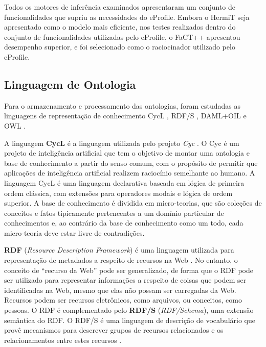 Todos os motores de inferência examinados apresentaram um conjunto de funcionalidades que supriu as necessidades do eProfile. Embora o HermiT seja apresentado como o modelo mais eficiente, nos testes realizados dentro do conjunto de funcionalidades utilizadas pelo eProfile, o FaCT++ apresentou desempenho superior, e foi selecionado como o raciocinador utilizado pelo eProfile.


\subsection{Linguagem de Ontologia}
\label{sec:ling_ontologia}

Para o armazenamento e processamento das ontologias, foram estudadas as linguagens de representação de conhecimento CycL \cite{lenat89}, RDF/S \cite{rdfs}, DAML+OIL \cite{daconta03} e OWL \cite{daconta03}.

A linguagem \textbf{CycL} é a linguagem utilizada pelo projeto \emph{Cyc} \cite{lenat89}. O Cyc é um projeto de inteligência artificial que tem o objetivo de montar uma ontologia e base de conhecimento a partir do senso comum, com o propósito de permitir que aplicações de inteligência artificial realizem raciocínio semelhante ao humano. A linguagem CycL é uma linguagem declarativa baseada em lógica de primeira ordem clássica, com extensões para operadores modais e lógica de ordem superior. A base de conhecimento é dividida em micro-teorias, que são coleções de conceitos e fatos tipicamente pertencentes a um domínio particular de conhecimentos e, ao contrário da base de conhecimento como um todo, cada micro-teoria deve estar livre de contradições.

\textbf{RDF} ({\em Resource Description Framework}) é uma linguagem utilizada para representação de metadados a respeito de recursos na Web \cite{rdf}. No entanto, o conceito de ``recurso da Web'' pode ser generalizado, de forma que o RDF pode ser utilizado para representar informações a respeito de coisas que podem ser identificadas na Web, mesmo que elas não possam ser carregadas da Web. Recursos podem ser recursos eletrônicos, como arquivos, ou conceitos, como pessoas. O RDF é complementado pelo \textbf{RDF/S} ({\em RDF/Schema}), uma extensão semântica do RDF. O RDF/S é uma linguagem de descrição de vocabulário que provê mecanismos para descrever grupos de recursos relacionados e os relacionamentos entre estes recursos \cite{rdfs}.

